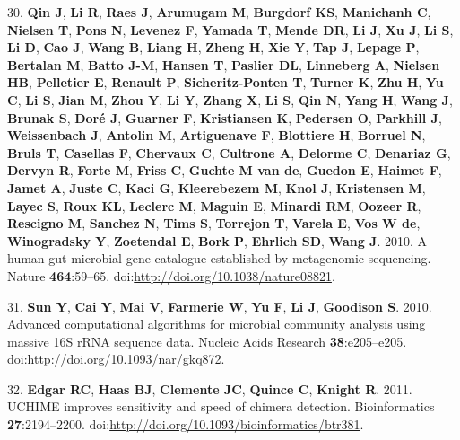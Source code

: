 \documentclass[12pt,]{article}
\begin{document}
30. \textbf{Qin J}, \textbf{Li R}, \textbf{Raes J}, \textbf{Arumugam M},
\textbf{Burgdorf KS}, \textbf{Manichanh C}, \textbf{Nielsen T},
\textbf{Pons N}, \textbf{Levenez F}, \textbf{Yamada T}, \textbf{Mende
DR}, \textbf{Li J}, \textbf{Xu J}, \textbf{Li S}, \textbf{Li D},
\textbf{Cao J}, \textbf{Wang B}, \textbf{Liang H}, \textbf{Zheng H},
\textbf{Xie Y}, \textbf{Tap J}, \textbf{Lepage P}, \textbf{Bertalan M},
\textbf{Batto J-M}, \textbf{Hansen T}, \textbf{Paslier DL},
\textbf{Linneberg A}, \textbf{Nielsen HB}, \textbf{Pelletier E},
\textbf{Renault P}, \textbf{Sicheritz-Ponten T}, \textbf{Turner K},
\textbf{Zhu H}, \textbf{Yu C}, \textbf{Li S}, \textbf{Jian M},
\textbf{Zhou Y}, \textbf{Li Y}, \textbf{Zhang X}, \textbf{Li S},
\textbf{Qin N}, \textbf{Yang H}, \textbf{Wang J}, \textbf{Brunak S},
\textbf{Doré J}, \textbf{Guarner F}, \textbf{Kristiansen K},
\textbf{Pedersen O}, \textbf{Parkhill J}, \textbf{Weissenbach J},
\textbf{Antolin M}, \textbf{Artiguenave F}, \textbf{Blottiere H},
\textbf{Borruel N}, \textbf{Bruls T}, \textbf{Casellas F},
\textbf{Chervaux C}, \textbf{Cultrone A}, \textbf{Delorme C},
\textbf{Denariaz G}, \textbf{Dervyn R}, \textbf{Forte M}, \textbf{Friss
C}, \textbf{Guchte M van de}, \textbf{Guedon E}, \textbf{Haimet F},
\textbf{Jamet A}, \textbf{Juste C}, \textbf{Kaci G}, \textbf{Kleerebezem
M}, \textbf{Knol J}, \textbf{Kristensen M}, \textbf{Layec S},
\textbf{Roux KL}, \textbf{Leclerc M}, \textbf{Maguin E}, \textbf{Minardi
RM}, \textbf{Oozeer R}, \textbf{Rescigno M}, \textbf{Sanchez N},
\textbf{Tims S}, \textbf{Torrejon T}, \textbf{Varela E}, \textbf{Vos W
de}, \textbf{Winogradsky Y}, \textbf{Zoetendal E}, \textbf{Bork P},
\textbf{Ehrlich SD}, \textbf{Wang J}. 2010. A human gut microbial gene
catalogue established by metagenomic sequencing. Nature
\textbf{464}:59--65. doi:\url{http://doi.org/10.1038/nature08821}.

31. \textbf{Sun Y}, \textbf{Cai Y}, \textbf{Mai V}, \textbf{Farmerie W},
\textbf{Yu F}, \textbf{Li J}, \textbf{Goodison S}. 2010. Advanced
computational algorithms for microbial community analysis using massive
16S rRNA sequence data. Nucleic Acids Research \textbf{38}:e205--e205.
doi:\url{http://doi.org/10.1093/nar/gkq872}.

32. \textbf{Edgar RC}, \textbf{Haas BJ}, \textbf{Clemente JC},
\textbf{Quince C}, \textbf{Knight R}. 2011. UCHIME improves sensitivity
and speed of chimera detection. Bioinformatics \textbf{27}:2194--2200.
doi:\url{http://doi.org/10.1093/bioinformatics/btr381}.
\end{document}
